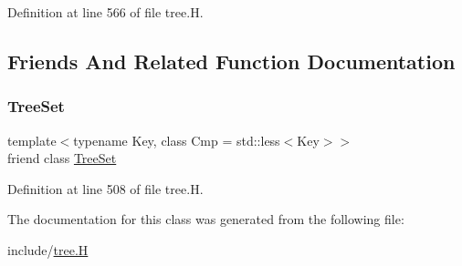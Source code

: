 Definition at line 566 of file tree.\+H.



\subsection{Friends And Related Function Documentation}
\mbox{\label{class_designar_1_1_tree_set_1_1_preorder_iterator_a7caa42294700d2a60905ec3458a7cd8a}} 
\subsubsection{\texorpdfstring{Tree\+Set}{TreeSet}}
{\footnotesize\ttfamily template$<$typename Key, class Cmp = std\+::less$<$\+Key$>$$>$ \\
friend class \hyperlink{class_designar_1_1_tree_set}{Tree\+Set}\hspace{0.3cm}{\ttfamily [friend]}}



Definition at line 508 of file tree.\+H.



The documentation for this class was generated from the following file\+:\begin{DoxyCompactItemize}
\item 
include/\hyperlink{tree_8_h}{tree.\+H}\end{DoxyCompactItemize}

